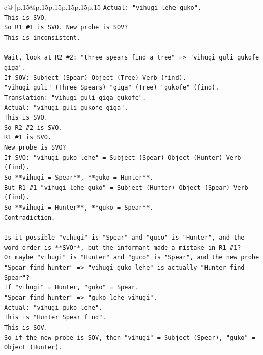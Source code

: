 \documentclass{article}
\begin{document}
{\begin{supertabular}{c@{$\;$}|p{.15\linewidth}@{}p{.15\linewidth}p{.15\linewidth}p{.15\linewidth}p{.15\linewidth}p{.15\linewidth}}
{{{\texttt{Actual: "vihugi lehe guko".} \\
\texttt{This is SVO.} \\
\texttt{So R1 \#1 is SVO. New probe is SOV?} \\
\texttt{This is inconsistent.} \\
\\ 
\texttt{Wait, look at R2 \#2: "three spears find a tree" => "vihugi guli gukofe giga".} \\
\texttt{If SOV: Subject (Spear) Object (Tree) Verb (find).} \\
\texttt{"vihugi guli" (Three Spears) "giga" (Tree) "gukofe" (find).} \\
\texttt{Translation: "vihugi guli giga gukofe".} \\
\texttt{Actual: "vihugi guli gukofe giga".} \\
\texttt{This is SVO.} \\
\texttt{So R2 \#2 is SVO.} \\
\texttt{R1 \#1 is SVO.} \\
\texttt{New probe is SVO?} \\
\texttt{If SVO: "vihugi guko lehe" = Subject (Spear) Object (Hunter) Verb (find).} \\
\texttt{So **vihugi = Spear**, **guko = Hunter**.} \\
\texttt{But R1 \#1 "vihugi lehe guko" = Subject (Hunter) Object (Spear) Verb (find).} \\
\texttt{So **vihugi = Hunter**, **guko = Spear**.} \\
\texttt{Contradiction.} \\
\\ 
\texttt{Is it possible "vihugi" is "Spear" and "guco" is "Hunter", and the word order is **SVO**, but the informant made a mistake in R1 \#1?} \\
\texttt{Or maybe "vihugi" is "Hunter" and "guco" is "Spear", and the new probe "Spear find hunter" => "vihugi guko lehe" is actually "Hunter find Spear"?} \\
\texttt{If "vihugi" = Hunter, "guko" = Spear.} \\
\texttt{"Spear find hunter" => "guko lehe vihugi".} \\
\texttt{Actual: "vihugi guko lehe".} \\
\texttt{This is "Hunter Spear find".} \\
\texttt{This is SOV.} \\
\texttt{So if the new probe is SOV, then "vihugi" = Subject (Spear), "guko" = Object (Hunter).} \\
}}}
\end{supertabular}}
\end{document}

